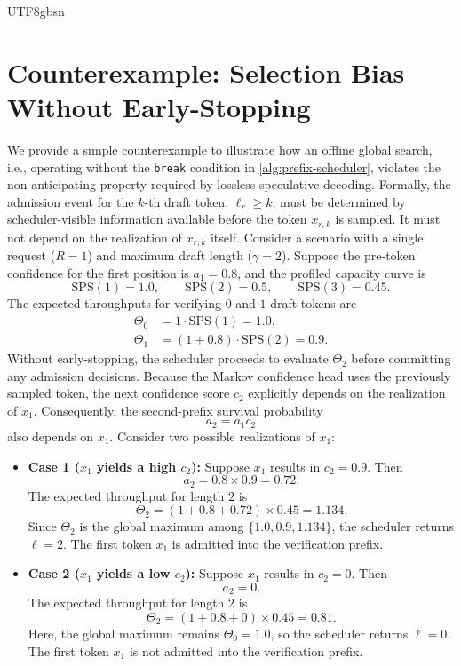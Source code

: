 \documentclass[11pt, a4paper, logo, copyright, nonumbering]{deepseek}
\begin{document}
\begin{CJK*}{UTF8}{gbsn}
\section{Counterexample: Selection Bias Without Early-Stopping}
\label{app:counterexample}
We provide a simple counterexample to illustrate how an offline global search, i.e., operating without the \texttt{break} condition in \autoref{alg:prefix-scheduler}, violates the non-anticipating property required by lossless speculative decoding. Formally, the admission event for the $k$-th draft token, $\ell_r \ge k$, must be determined by scheduler-visible information available before the token $x_{r,k}$ is sampled. It must not depend on the realization of $x_{r,k}$ itself.
Consider a scenario with a single request ($R=1$) and maximum draft length ($\gamma=2$). Suppose the pre-token confidence for the first position is $a_1 = 0.8$, and the profiled capacity curve is
\[
\mathrm{SPS}(1) = 1.0,\qquad
\mathrm{SPS}(2) = 0.5,\qquad
\mathrm{SPS}(3) = 0.45.
\]
The expected throughputs for verifying $0$ and $1$ draft tokens are
\begin{align*}
\Theta_0 &= 1 \cdot \mathrm{SPS}(1) = 1.0, \\
\Theta_1 &= (1 + 0.8) \cdot \mathrm{SPS}(2) = 0.9.
\end{align*}
Without early-stopping, the scheduler proceeds to evaluate $\Theta_2$ before committing any admission decisions. Because the Markov confidence head uses the previously sampled token, the next confidence score $c_2$ explicitly depends on the realization of $x_1$. Consequently, the second-prefix survival probability
\[
a_2 = a_1 c_2
\]
also depends on $x_1$. Consider two possible realizations of $x_1$:
\begin{itemize}
\item \textbf{Case 1 ($x_1$ yields a high $c_2$):}
Suppose $x_1$ results in $c_2 = 0.9$. Then
\[
a_2 = 0.8 \times 0.9 = 0.72.
\]
The expected throughput for length $2$ is
\[
\Theta_2 = (1 + 0.8 + 0.72) \times 0.45 = 1.134.
\]
Since $\Theta_2$ is the global maximum among $\{1.0, 0.9, 1.134\}$, the scheduler returns $\ell=2$. The first token $x_1$ is admitted into the verification prefix.
\item \textbf{Case 2 ($x_1$ yields a low $c_2$):}
Suppose $x_1$ results in $c_2 = 0$. Then
\[
    a_2 = 0.
\]
The expected throughput for length $2$ is
\[
    \Theta_2 = (1 + 0.8 + 0) \times 0.45 = 0.81.
\]
Here, the global maximum remains $\Theta_0 = 1.0$, so the scheduler returns $\ell=0$. The first token $x_1$ is not admitted into the verification prefix.

\end{itemize}
\end{CJK*}
\end{document}
